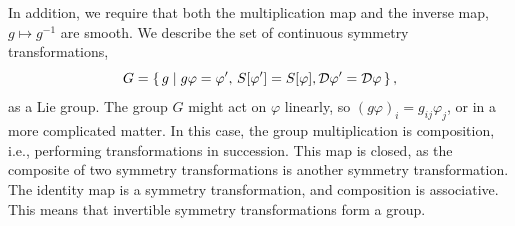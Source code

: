 In addition, we require that both the multiplication map and the inverse map, $g \mapsto g^{-1}$ are smooth.
We describe the set of continuous symmetry transformations, 
\begin{equation}
    G = \left\{\, g \mid g \varphi = \varphi', \, S[\varphi'] = S[\varphi], \mathcal{D} \varphi' = \mathcal{D} \varphi  \,\right\},
\end{equation}
as a Lie group.
The group $G$ might act on $\varphi$ linearly, so $(g\varphi)_i = g_{ij}\varphi_j$, or in a more complicated matter.
In this case, the group multiplication is composition, i.e., performing transformations in succession.
This map is closed, as the composite of two symmetry transformations is another symmetry transformation.
The identity map is a symmetry transformation, and composition is associative.
This means that invertible symmetry transformations form a group.

